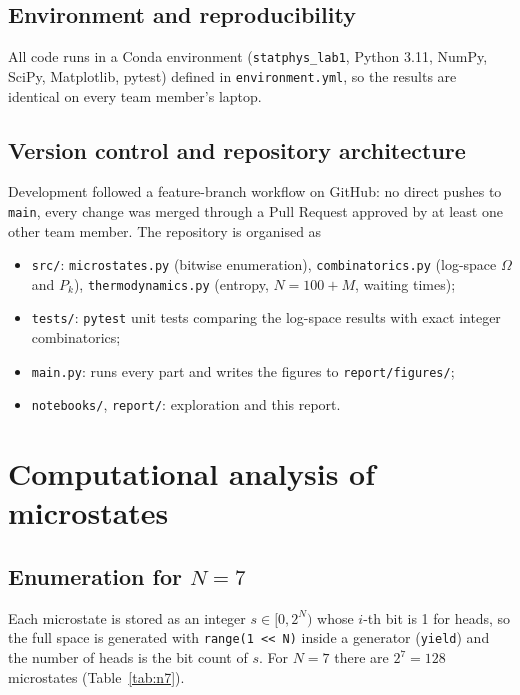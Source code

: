 \documentclass[11pt,a4paper]{article}
\begin{document}
\subsection{Environment and reproducibility}
All code runs in a Conda environment (\texttt{statphys\_lab1}, Python 3.11,
NumPy, SciPy, Matplotlib, pytest) defined in \texttt{environment.yml}, so the
results are identical on every team member's laptop.

\subsection{Version control and repository architecture}
Development followed a feature-branch workflow on GitHub: no direct pushes to
\texttt{main}, every change was merged through a Pull Request approved by at
least one other team member. The repository is organised as
\begin{itemize}
  \item \texttt{src/}: \texttt{microstates.py} (bitwise enumeration),
        \texttt{combinatorics.py} (log-space $\Omega$ and $P_k$),
        \texttt{thermodynamics.py} (entropy, $N=100+M$, waiting times);
  \item \texttt{tests/}: \texttt{pytest} unit tests comparing the log-space
        results with exact integer combinatorics;
  \item \texttt{main.py}: runs every part and writes the figures to
        \texttt{report/figures/};
  \item \texttt{notebooks/}, \texttt{report/}: exploration and this report.
\end{itemize}

\section{Computational analysis of microstates}
\subsection{Enumeration for $N=7$}
Each microstate is stored as an integer $s\in[0,2^N)$ whose $i$-th bit is 1
for heads, so the full space is generated with \texttt{range(1 << N)} inside a
generator (\texttt{yield}) and the number of heads is the bit count of $s$.
For $N=7$ there are $2^7=128$ microstates (Table~\ref{tab:n7}).
\end{document}
